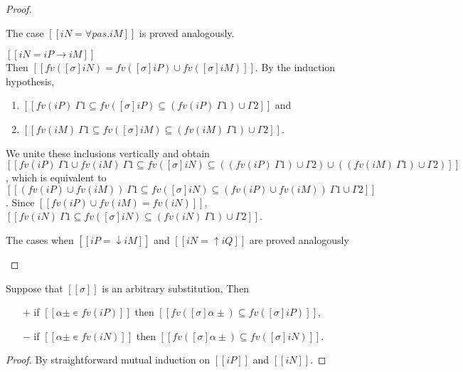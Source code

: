 \begin{proof}
\begin{caseof}
    \item The case $[[iN = ∀pas.iM]]$ is proved analogously.
    \item $[[iN = iP → iM]]$\\
      Then $[[fv([σ]iN) = fv([σ]iP) ∪ fv([σ]iM)]]$.
      By the induction hypothesis, 
      \begin{enumerate}
        \item $[[ fv(iP) \ {Γ1} ⊆ fv([σ]iP) ⊆ (fv(iP) \ {Γ1}) ∪ {Γ2}]]$ and
        \item $[[ fv(iM) \ {Γ1} ⊆ fv([σ]iM) ⊆ (fv(iM) \ {Γ1}) ∪ {Γ2}]]$.
      \end{enumerate}
      We unite these inclusions vertically and obtain
      $[[ fv(iP) \ {Γ1} ∪ fv(iM) \ {Γ1} ⊆ fv([σ]iN) ⊆ ((fv(iP) \ {Γ1}) ∪ {Γ2}) ∪ ((fv(iM) \ {Γ1}) ∪ {Γ2})]]$,
      which is equivalent to 
      $[[ (fv(iP) ∪ fv(iM)) \ {Γ1} ⊆ fv([σ]iN) ⊆ (fv(iP) ∪ fv(iM)) \ {Γ1} ∪ {Γ2}]]$.
      Since $[[fv(iP) ∪ fv(iM) = fv(iN)]]$, 
      $[[fv(iN) \ {Γ1} ⊆ fv([σ]iN) ⊆ (fv(iN) \ {Γ1}) ∪ {Γ2}]]$.
    \item The cases when $[[iP = ↓iM]]$ and $[[iN = ↑iQ]]$ are proved
      analogously
  \end{caseof}
\end{proof}

\begin{lemma}
  \label{lemma:subst-fv-image}
  Suppose that $[[σ]]$ is an arbitrary substitution, 
  Then 
  \begin{itemize}
    \item [$+$] if $[[α± ∊ fv(iP)]]$ then $[[ fv([σ]α±) ⊆ fv([σ]iP) ]]$,
    \item [$-$] if $[[α± ∊ fv(iN)]]$ then $[[ fv([σ]α±) ⊆ fv([σ]iN) ]]$.
  \end{itemize}
\end{lemma}
\begin{proof}
  By straightforward mutual induction on $[[iP]]$ and $[[iN]]$.
\end{proof}
